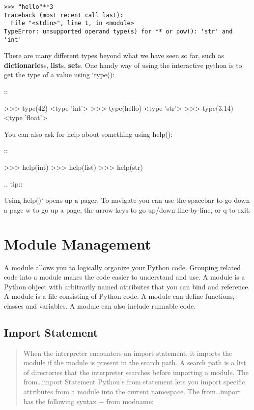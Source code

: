 \begin{verbatim}
>>> "hello"**3
Traceback (most recent call last):
  File "<stdin>", line 1, in <module>
TypeError: unsupported operand type(s) for ** or pow(): 'str' and 'int'
\end{verbatim}

There are many different types beyond what we have seen so far, such as
\textbf{dictionaries}s, \textbf{list}s, \textbf{set}s. One handy way of
using the interactive python is to get the type of a value using
`type():

::

   \textgreater{}\textgreater{}\textgreater{} type(42)
   \textless{}type 'int'\textgreater{}
   \textgreater{}\textgreater{}\textgreater{} type(hello)
   \textless{}type 'str'\textgreater{}
   \textgreater{}\textgreater{}\textgreater{} type(3.14)
   \textless{}type 'float'\textgreater{}

You can also ask for help about something using help():

::

   \textgreater{}\textgreater{}\textgreater{} help(int)
   \textgreater{}\textgreater{}\textgreater{} help(list)
   \textgreater{}\textgreater{}\textgreater{} help(str)

.. tip::

   Using help()` opens up a pager. To navigate you can use the spacebar
to go down a page w to go up a page, the arrow keys to go up/down
line-by-line, or q to exit.

\section{Module Management}\label{module-management}

A module allows you to logically organize your Python code. Grouping
related code into a module makes the code easier to understand and use.
A module is a Python object with arbitrarily named attributes that you
can bind and reference. A module is a file consisting of Python code. A
module can define functions, classes and variables. A module can also
include runnable code.

\subsection{Import Statement}\label{import-statement}

\begin{quote}
When the interpreter encounters an import statement, it imports the
module if the module is present in the search path. A search path is a
list of directories that the interpreter searches before importing a
module. The from\ldots{}import Statement Python's from statement lets
you import specific attributes from a module into the current namespace.
The from\ldots{}import has the following syntax − from modname:
\end{quote}

